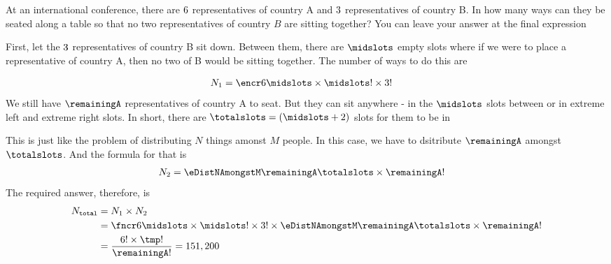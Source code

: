 



\gcalcexpr[0]
\gcalcexpr[0]
\gcalcexpr[0]
\gcalcexpr[0]

\SUBTRACT{}\a
\ADD{}\nr

\question[5] At an international conference, there are $6$ representatives of country A and $3$ representatives 
of country B. In how many ways can they be seated along a table so that no two representatives of country $B$ 
are sitting together? You can leave your answer at the final expression


\watchout[-30pt]

\begin{solution}[\halfpage]
	First, let the $3$ representatives of country B sit down. Between them, there are $\midslots$ empty 
	slots where if we were to place a representative of country A, then no two of B would be sitting 
	together. The number of ways to do this are 
	
	\begin{align}
		N_1 &= \encr\vbone\midslots\times\midslots ! \times\vbtwo !
	\end{align}
	We still have $\remainingA$ representatives of country A to seat. But they can sit anywhere - 
	in the $\midslots$ slots between or in extreme left and extreme right slots. In short, there are 
	$\totalslots = (\midslots + 2)$ slots for them to be in 
	
	This is just like the problem of distributing $N$ things amonst $M$ people. In this case, we 
	have to dsitribute $\remainingA$ amongst $\totalslots$. And the formula for that is
	\begin{align}
		N_2 &= \eDistNAmongstM\remainingA\totalslots\times\remainingA !
	\end{align}
	The required answer, therefore, is 
	\begin{align}
		N_{\texttt{total}} &= N_1 \times N_2 \\ 
		&= \fncr\vbone\midslots\times\midslots ! \times\vbtwo ! \times \eDistNAmongstM\remainingA\totalslots\times\remainingA ! \\
		&= \dfrac{\vbone ! \times \tmp !}{\remainingA !} = \vbthree
	\end{align}
\end{solution}
